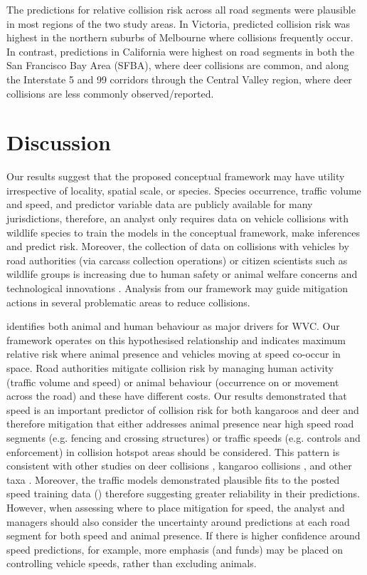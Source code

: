 The predictions for relative collision risk across all road segments were plausible in most regions of the two study areas.  In Victoria, predicted collision risk was highest in the northern suburbs of Melbourne where collisions frequently occur. In contrast, predictions in California were highest on road segments in both the San Francisco Bay Area (SFBA), where deer collisions are common, and along the Interstate 5 and 99 corridors through the Central Valley region, where deer collisions are less commonly observed/reported.

\section{Discussion}

Our results suggest that the proposed conceptual framework may have utility irrespective of locality, spatial scale, or species.  Species occurrence, traffic volume and speed, and  predictor variable data are publicly available for many jurisdictions, therefore, an analyst only requires data on vehicle collisions with wildlife species to train the models in the conceptual framework, make inferences and predict risk.  Moreover, the collection of data on collisions with vehicles by road authorities (via carcass collection operations) or citizen scientists such as wildlife groups is increasing due to human safety or animal welfare concerns and technological innovations \citep[see][]{olso14,shil15b}.  Analysis from our framework may guide mitigation actions in several problematic areas to reduce collisions.

\cite{form03} identifies both animal and human behaviour as major drivers for WVC.  Our framework operates on this hypothesised relationship and indicates maximum relative risk where animal presence and vehicles moving at speed co-occur in space.  Road authorities mitigate collision risk by managing human activity (traffic volume and speed) or animal behaviour (occurrence on or movement across the road) and these have different costs.  Our results demonstrated that speed is an important predictor of collision risk for both kangaroos and deer and therefore mitigation that either addresses animal presence near high speed road segments (e.g. fencing and crossing structures) or traffic speeds (e.g. controls and enforcement) in collision hotspot areas should be considered.  This pattern is consistent with other studies on deer collisions \citep{gkri13,meis14,sudh09}, kangaroo collisions \citep{rowd08}, and other taxa \citep{guns11}.  Moreover, the traffic models demonstrated plausible fits to the posted speed training data () therefore suggesting greater reliability in their predictions.  However, when assessing where to place mitigation for speed, the analyst and managers should also consider the uncertainty around predictions at each road segment for both speed and animal presence. If there is higher confidence around speed predictions, for example, more emphasis (and funds) may be placed on controlling vehicle speeds, rather than excluding animals.

